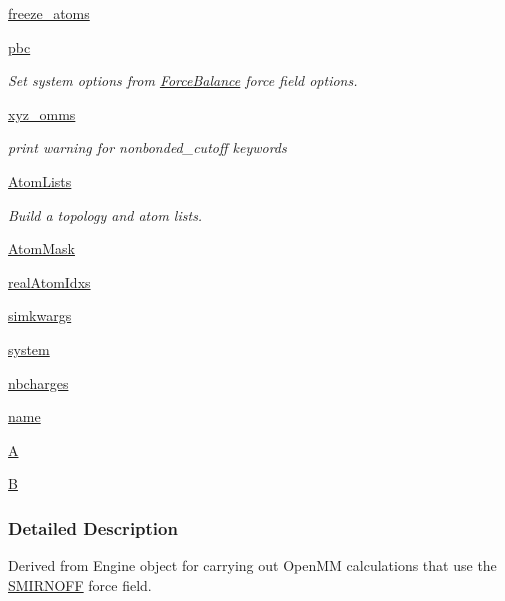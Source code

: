 \begin{DoxyCompactItemize}
\hyperlink{classsrc_1_1smirnoffio_1_1SMIRNOFF_a20b0d7610a183e1c47128b578f125261}{freeze\+\_\+atoms}
\item 
\hyperlink{classsrc_1_1smirnoffio_1_1SMIRNOFF_a10129110be75721cbb8fb7b612dc8468}{pbc}
\begin{DoxyCompactList}\small\item\em Set system options from \hyperlink{namespaceForceBalance}{Force\+Balance} force field options. \end{DoxyCompactList}\item 
\hyperlink{classsrc_1_1smirnoffio_1_1SMIRNOFF_a817c140385e54c6610e28166c7baccdd}{xyz\+\_\+omms}
\begin{DoxyCompactList}\small\item\em print warning for \textquotesingle{}nonbonded\+\_\+cutoff\textquotesingle{} keywords \end{DoxyCompactList}\item 
\hyperlink{classsrc_1_1smirnoffio_1_1SMIRNOFF_ac75ac9d6176cbb7e474ef0a6e01e5e4d}{Atom\+Lists}
\begin{DoxyCompactList}\small\item\em Build a topology and atom lists. \end{DoxyCompactList}\item 
\hyperlink{classsrc_1_1smirnoffio_1_1SMIRNOFF_ae1c87f695e734850c13d227f0410174c}{Atom\+Mask}
\item 
\hyperlink{classsrc_1_1smirnoffio_1_1SMIRNOFF_ac7da05e21b9c53ee04a79bcda5f8b9ed}{real\+Atom\+Idxs}
\item 
\hyperlink{classsrc_1_1smirnoffio_1_1SMIRNOFF_aa474d005cacb738837ed098a6024e582}{simkwargs}
\item 
\hyperlink{classsrc_1_1smirnoffio_1_1SMIRNOFF_ab212ed1ecf62ddce046e82bc2f7cef32}{system}
\item 
\hyperlink{classsrc_1_1smirnoffio_1_1SMIRNOFF_a44b71ccf421005d312de6f13914fa248}{nbcharges}
\item 
\hyperlink{classsrc_1_1smirnoffio_1_1SMIRNOFF_a11542ad6ce7fca3d8e201d3977bf8379}{name}
\item 
\hyperlink{classsrc_1_1smirnoffio_1_1SMIRNOFF_a02a7b33ed3283d2b953f5aad2b896e83}{A}
\item 
\hyperlink{classsrc_1_1smirnoffio_1_1SMIRNOFF_ab25be3fd5727b04f5f98eab653e9823a}{B}
\end{DoxyCompactItemize}


\subsubsection{Detailed Description}
Derived from Engine object for carrying out Open\+MM calculations that use the \hyperlink{classsrc_1_1smirnoffio_1_1SMIRNOFF}{S\+M\+I\+R\+N\+O\+FF} force field. 




